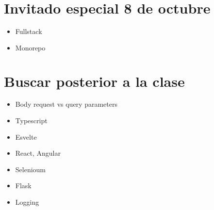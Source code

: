 \section{Invitado especial 8 de octubre}
\begin{itemize}
    \item Fullstack
    \item Monorepo
\end{itemize}




\section{Buscar posterior a la clase}
\begin{itemize}
    \item Body request vs query parameters
    \item Typescript
    \item Esvelte 
    \item React, Angular
    \item Selenioum
    \item Flask 
    \item Logging
\end{itemize}


